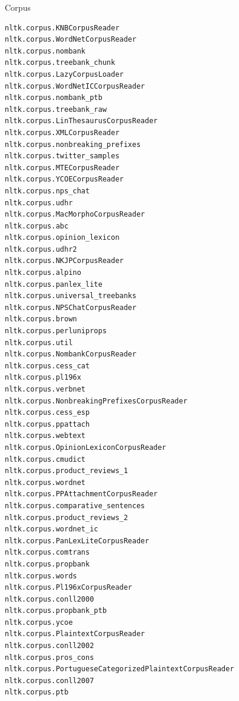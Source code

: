 \documentclass[11pt, handout]{beamer}
\begin{document}
\begin{frame}[fragile]{Corpus}
\begin{itemize}
{\begin{verbatim}
nltk.corpus.KNBCorpusReader                             nltk.corpus.WordNetCorpusReader                         nltk.corpus.nombank                                     nltk.corpus.treebank_chunk
nltk.corpus.LazyCorpusLoader                            nltk.corpus.WordNetICCorpusReader                       nltk.corpus.nombank_ptb                                 nltk.corpus.treebank_raw
nltk.corpus.LinThesaurusCorpusReader                    nltk.corpus.XMLCorpusReader                             nltk.corpus.nonbreaking_prefixes                        nltk.corpus.twitter_samples
nltk.corpus.MTECorpusReader                             nltk.corpus.YCOECorpusReader                            nltk.corpus.nps_chat                                    nltk.corpus.udhr
nltk.corpus.MacMorphoCorpusReader                       nltk.corpus.abc                                         nltk.corpus.opinion_lexicon                             nltk.corpus.udhr2
nltk.corpus.NKJPCorpusReader                            nltk.corpus.alpino                                      nltk.corpus.panlex_lite                                 nltk.corpus.universal_treebanks
nltk.corpus.NPSChatCorpusReader                         nltk.corpus.brown                                       nltk.corpus.perluniprops                                nltk.corpus.util
nltk.corpus.NombankCorpusReader                         nltk.corpus.cess_cat                                    nltk.corpus.pl196x                                      nltk.corpus.verbnet
nltk.corpus.NonbreakingPrefixesCorpusReader             nltk.corpus.cess_esp                                    nltk.corpus.ppattach                                    nltk.corpus.webtext
nltk.corpus.OpinionLexiconCorpusReader                  nltk.corpus.cmudict                                     nltk.corpus.product_reviews_1                           nltk.corpus.wordnet
nltk.corpus.PPAttachmentCorpusReader                    nltk.corpus.comparative_sentences                       nltk.corpus.product_reviews_2                           nltk.corpus.wordnet_ic
nltk.corpus.PanLexLiteCorpusReader                      nltk.corpus.comtrans                                    nltk.corpus.propbank                                    nltk.corpus.words
nltk.corpus.Pl196xCorpusReader                          nltk.corpus.conll2000                                   nltk.corpus.propbank_ptb                                nltk.corpus.ycoe
nltk.corpus.PlaintextCorpusReader                       nltk.corpus.conll2002                                   nltk.corpus.pros_cons                                   
nltk.corpus.PortugueseCategorizedPlaintextCorpusReader  nltk.corpus.conll2007                                   nltk.corpus.ptb         
   \end{verbatim}
  }
 \end{itemize}
\end{frame}
\end{document}
